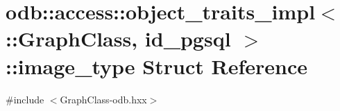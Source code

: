 \hypertarget{structodb_1_1access_1_1object__traits__impl_3_01_1_1_graph_class_00_01id__pgsql_01_4_1_1image__type}{}\section{odb\+:\+:access\+:\+:object\+\_\+traits\+\_\+impl$<$ \+:\+:Graph\+Class, id\+\_\+pgsql $>$\+:\+:image\+\_\+type Struct Reference}
\label{structodb_1_1access_1_1object__traits__impl_3_01_1_1_graph_class_00_01id__pgsql_01_4_1_1image__type}


{\ttfamily \#include $<$Graph\+Class-\/odb.\+hxx$>$}

